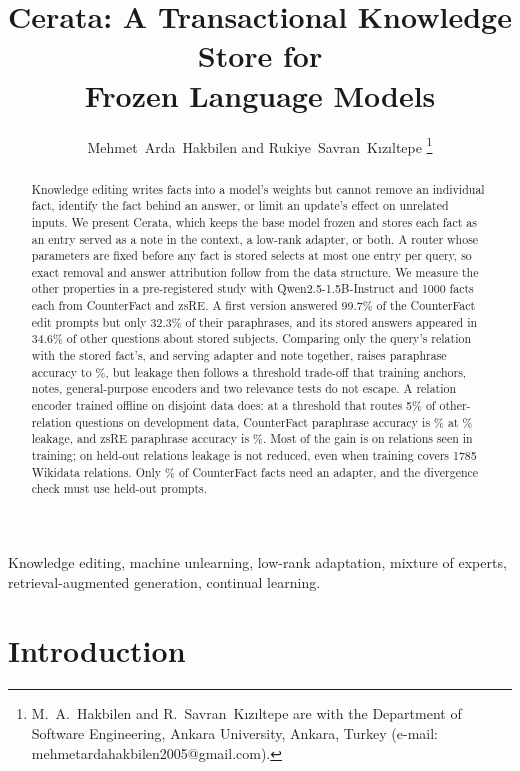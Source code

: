 \documentclass[journal,10pt]{IEEEtran}
\title{Cerata: A Transactional Knowledge Store for\\ Frozen Language Models}
\author{Mehmet~Arda~Hakbilen and Rukiye~Savran~K{\i}z{\i}ltepe%
\thanks{M.~A.~Hakbilen and R.~Savran~K{\i}z{\i}ltepe are with the Department of
Software Engineering, Ankara University, Ankara, Turkey (e-mail:
mehmetardahakbilen2005@gmail.com).}}
\begin{document}
\maketitle

\begin{abstract}
Knowledge editing writes facts into a model's weights but cannot remove an
individual fact, identify the fact behind an answer, or limit an update's effect on
unrelated inputs. We present Cerata, which keeps the base model
frozen and stores each fact as an entry served as a note in the context, a low-rank
adapter, or both. A router whose parameters are fixed before any fact is stored
selects at most one entry per query, so exact removal and answer attribution follow from
the data structure. We measure the other properties in a pre-registered study with
Qwen2.5-1.5B-Instruct and 1000 facts each from CounterFact and zsRE. A first version
answered 99.7\% of the CounterFact edit prompts but only 32.3\% of their paraphrases, and
its stored answers appeared in 34.6\% of other questions about stored subjects. Comparing
only the query's relation with the stored fact's, and serving adapter and note
together, raises paraphrase accuracy to \vCfParaBothPct\%, but leakage then follows a
threshold trade-off that training anchors, notes, general-purpose encoders and two
relevance tests do not escape. A relation encoder trained
offline on disjoint data does: at a threshold that routes 5\% of other-relation questions
on development data, CounterFact paraphrase accuracy is \xCfParaBothPct\% at
\xCfEthreeLeakBothPct\% leakage, and zsRE paraphrase accuracy is \xZsParaBothPct\%. Most
of the gain is on relations seen in training; on held-out relations leakage is not
reduced, even when training covers 1785 Wikidata relations. Only \vCfTierFracPct\% of CounterFact facts need an adapter, and the divergence check must
use held-out prompts.
\end{abstract}

\begin{IEEEkeywords}
Knowledge editing, machine unlearning, low-rank adaptation, mixture of experts,
retrieval-augmented generation, continual learning.
\end{IEEEkeywords}

\section{Introduction}
\label{sec:intro}
\end{document}
